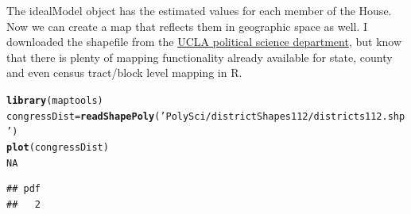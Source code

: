 \documentclass[english,nohyper,titlepage]{tufte-handout}\usepackage[]{graphicx}\usepackage[]{color}
\makeatletter
\newcommand{\hlnum}[1]{\textcolor[rgb]{0.686,0.059,0.569}{#1}}%
\newcommand{\hlstr}[1]{\textcolor[rgb]{0.192,0.494,0.8}{#1}}%
\newcommand{\hlstd}[1]{\textcolor[rgb]{0.345,0.345,0.345}{#1}}%
\newcommand{\hlkwb}[1]{\textcolor[rgb]{0.69,0.353,0.396}{#1}}%
\newcommand{\hlkwd}[1]{\textcolor[rgb]{0.737,0.353,0.396}{\textbf{#1}}}%
\newenvironment{kframe}{%
 \def\at@end@of@kframe{}%
 \ifinner\ifhmode%
  \def\at@end@of@kframe{\end{minipage}}%
  \begin{minipage}{\columnwidth}%
 \fi\fi%
 \def\FrameCommand##1{\hskip\@totalleftmargin \hskip-\fboxsep
 \colorbox{shadecolor}{##1}\hskip-\fboxsep
     \hskip-\linewidth \hskip-\@totalleftmargin \hskip\columnwidth}%
 \MakeFramed {\advance\hsize-\width
   \@totalleftmargin\z@ \linewidth\hsize
   \@setminipage}}%
 {\par\unskip\endMakeFramed%
 \at@end@of@kframe}
\newenvironment{knitrout}{}{} %
\makeatother
\begin{document}
The idealModel object has the estimated values for each member of the House.  Now we can create a map that reflects them in geographic space as well.  I downloaded the shapefile from the \href{http://cdmaps.polisci.ucla.edu/}{UCLA political science department}, but know that there is plenty of mapping functionality already available for state, county and even census tract/block level mapping in R. 

\begin{knitrout}\footnotesize
{}\color{fgcolor}\begin{kframe}
\begin{alltt}
\hlkwd{library}\hlstd{(maptools)}
\hlstd{congressDist} \hlkwb{=} \hlkwd{readShapePoly}\hlstd{(}\hlstr{'PolySci/districtShapes112/districts112.shp'}\hlstd{)}
\hlkwd{plot}\hlstd{(congressDist)}
\hlnum{NA}
\end{alltt}
\end{kframe}
\end{knitrout}

\begin{knitrout}\footnotesize
{}\color{fgcolor}\begin{kframe}
\begin{verbatim}
## pdf 
##   2
\end{verbatim}
\end{kframe}
\end{knitrout}
\end{document}

